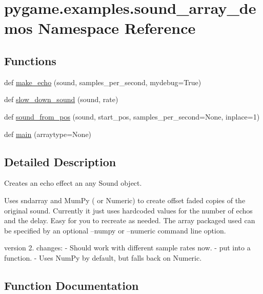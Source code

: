 \hypertarget{namespacepygame_1_1examples_1_1sound__array__demos}{}\section{pygame.\+examples.\+sound\+\_\+array\+\_\+demos Namespace Reference}
\label{namespacepygame_1_1examples_1_1sound__array__demos}
\subsection*{Functions}
\begin{DoxyCompactItemize}
\item 
def \hyperlink{namespacepygame_1_1examples_1_1sound__array__demos_abf020bfb096e724a14937f3b4e1d41e8}{make\+\_\+echo} (sound, samples\+\_\+per\+\_\+second, mydebug=True)
\item 
def \hyperlink{namespacepygame_1_1examples_1_1sound__array__demos_a5538155e0ecd86e2a7f99769b0846f0f}{slow\+\_\+down\+\_\+sound} (sound, rate)
\item 
def \hyperlink{namespacepygame_1_1examples_1_1sound__array__demos_a3ef2a5278ab9ef368dad0fe4a8d72003}{sound\+\_\+from\+\_\+pos} (sound, start\+\_\+pos, samples\+\_\+per\+\_\+second=None, inplace=1)
\item 
def \hyperlink{namespacepygame_1_1examples_1_1sound__array__demos_acbfb03de7788e106221eceef241c3259}{main} (arraytype=None)
\end{DoxyCompactItemize}


\subsection{Detailed Description}
\begin{DoxyVerb}Creates an echo effect an any Sound object.

Uses sndarray and MumPy ( or Numeric) to create offset faded copies of the
original sound. Currently it just uses hardcoded values for the
number of echos and the delay. Easy for you to recreate as 
needed. The array packaged used can be specified by an optional
--numpy or --numeric command line option.

version 2. changes:
- Should work with different sample rates now.
- put into a function.
- Uses NumPy by default, but falls back on Numeric.\end{DoxyVerb}
 

\subsection{Function Documentation}
\mbox{\label{namespacepygame_1_1examples_1_1sound__array__demos_acbfb03de7788e106221eceef241c3259}} 
